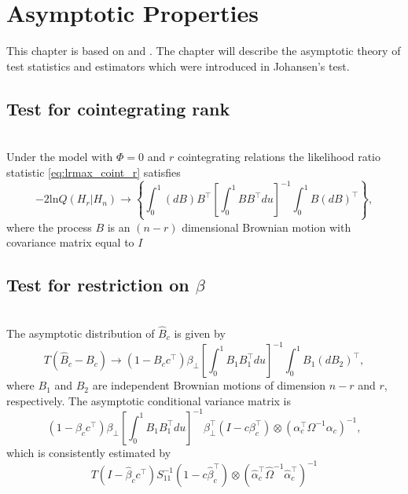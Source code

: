 \chapter{Asymptotic Properties}
This chapter is based on \cite{Statistica_analysis_of_cointegrating_vectors} and \cite{Modelling_of_cointegration_in_the_vector_autoregressive_model}. The chapter will describe the asymptotic theory of test statistics and estimators which were introduced in Johansen's test.

\section{Test for cointegrating rank}

\begin{thm}\phantom\\
    Under the model with $\Phi=0$ and $r$ cointegrating relations the likelihood ratio statistic \eqref{eq:lrmax_coint_r} satisfies
    \begin{equation*}
        -2 \text{ln}Q \left(H_r|H_n \right) \rightarrow \left\{ \int_0^1 (dB)B^{\top} \left[\int_0^1 BB^\top du \right]^{-1} \int_0^1 B(dB)^\top \right\},
    \end{equation*}
    where the process $B$ is an $(n-r)$ dimensional Brownian motion with covariance matrix equal to $I$
\end{thm}


\section{Test for restriction on $\beta$}
\begin{thm}\phantom\\
The asymptotic distribution of $\hat{B}_c$ is given by 
\begin{equation*}
    T(\hat{B}_c-B_c) \rightarrow (1-B_c c^\top) \beta_\perp \left[ \int_0^1 B_1 B_1^\top du \right]^{-1} \int_0^1 B_1(dB_2)^\top,
\end{equation*}
    where $B_1$ and $B_2$ are independent Brownian motions of dimension $n-r$ and $r$, respectively. The asymptotic conditional variance matrix is 
    \begin{equation*}
        (1-\beta_c c^\top) \beta_\perp \left[\int_0^1 B_1B_1^\top du \right]^{-1} \beta_\perp^\top (I-c\beta_c^\top ) \otimes (\alpha_c^\top \Omega^{-1}\alpha_c)^{-1},
    \end{equation*}
    which is consistently estimated by
    \begin{equation*}
        T(I-\hat{\beta}_c c^\top)S_{11}^{-1}(1-c\hat{\beta}_c^\top) \otimes (\hat{\alpha}_c^\top \hat{\Omega}^{-1}\hat{\alpha}_c^\top)^{-1}
    \end{equation*}
\end{thm}
